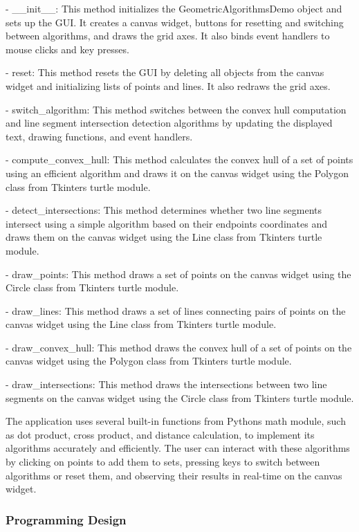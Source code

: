\documentclass[
]{article}
\begin{document}
- \_\_init\_\_: This method initializes the GeometricAlgorithmsDemo
object and sets up the GUI. It creates a canvas widget, buttons for
resetting and switching between algorithms, and draws the grid axes. It
also binds event handlers to mouse clicks and key presses.

- reset: This method resets the GUI by deleting all objects from the
canvas widget and initializing lists of points and lines. It also
redraws the grid axes.

- switch\_algorithm: This method switches between the convex hull
computation and line segment intersection detection algorithms by
updating the displayed text, drawing functions, and event handlers.

- compute\_convex\_hull: This method calculates the convex hull of a set
of points using an efficient algorithm and draws it on the canvas widget
using the Polygon class from Tkinter\textquotesingle s turtle module.

- detect\_intersections: This method determines whether two line
segments intersect using a simple algorithm based on their
endpoints\textquotesingle{} coordinates and draws them on the canvas
widget using the Line class from Tkinter\textquotesingle s turtle
module.

- draw\_points: This method draws a set of points on the canvas widget
using the Circle class from Tkinter\textquotesingle s turtle module.

- draw\_lines: This method draws a set of lines connecting pairs of
points on the canvas widget using the Line class from
Tkinter\textquotesingle s turtle module.

- draw\_convex\_hull: This method draws the convex hull of a set of
points on the canvas widget using the Polygon class from
Tkinter\textquotesingle s turtle module.

- draw\_intersections: This method draws the intersections between two
line segments on the canvas widget using the Circle class from
Tkinter\textquotesingle s turtle module.

The application uses several built-in functions from
Python\textquotesingle s math module, such as dot product, cross
product, and distance calculation, to implement its algorithms
accurately and efficiently. The user can interact with these algorithms
by clicking on points to add them to sets, pressing keys to switch
between algorithms or reset them, and observing their results in
real-time on the canvas widget.

\subsubsection{Programming Design}\label{programming-design}
\end{document}
